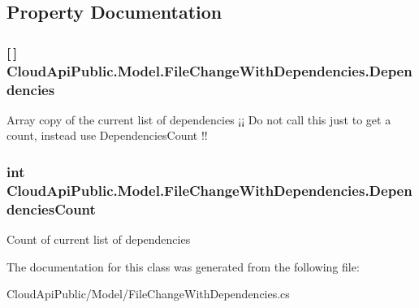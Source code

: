 \subsection{Property Documentation}
\hypertarget{class_cloud_api_public_1_1_model_1_1_file_change_with_dependencies_ab84bcbd3ecbc8923314249d2a131502b}{
\subsubsection[{Dependencies}]{ \mbox{[}$\,$\mbox{]} Cloud\-Api\-Public.\-Model.\-File\-Change\-With\-Dependencies.\-Dependencies\hspace{0.3cm}{\ttfamily [get]}}}\label{class_cloud_api_public_1_1_model_1_1_file_change_with_dependencies_ab84bcbd3ecbc8923314249d2a131502b}


Array copy of the current list of dependencies ¡¡ Do not call this just to get a count, instead use Dependencies\-Count !! 

\hypertarget{class_cloud_api_public_1_1_model_1_1_file_change_with_dependencies_aba0e8e759d2d91d0184e9a824d31772b}{
\subsubsection[{Dependencies\-Count}]{\setlength{\rightskip}{0pt plus 5cm}int Cloud\-Api\-Public.\-Model.\-File\-Change\-With\-Dependencies.\-Dependencies\-Count\hspace{0.3cm}{\ttfamily [get]}}}\label{class_cloud_api_public_1_1_model_1_1_file_change_with_dependencies_aba0e8e759d2d91d0184e9a824d31772b}


Count of current list of dependencies 



The documentation for this class was generated from the following file\-:\begin{DoxyCompactItemize}
\item 
Cloud\-Api\-Public/\-Model/File\-Change\-With\-Dependencies.\-cs\end{DoxyCompactItemize}
